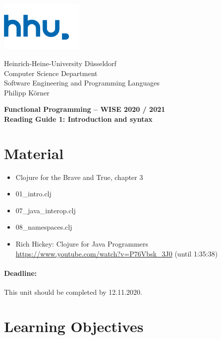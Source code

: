 \documentclass[11pt,a4paper]{article}
\begin{document}
\begin{minipage}[b]{\textwidth}
	\parbox[t]{5cm}{%
		\includegraphics[width=4cm]{unilogo}
		\hfill
	}
	\parbox[b]{11cm}{%
		Heinrich-Heine-University D\"usseldorf\\
		Computer Science Department\\
		Software Engineering and Programming Languages\\
		Philipp K\"orner
	}
\end{minipage}
\begin{center}
	\bf
	Functional Programming -- WISE 2020 / 2021\\
	Reading Guide 1: Introduction and syntax
\end{center}

\pagestyle{empty}

\section{Material} 

\begin{itemize}
\item Clojure for the Brave and True, chapter 3
\item 01\_intro.clj
\item 07\_java\_interop.clj
\item 08\_namespaces.clj
\item Rich Hickey: Clojure for Java Programmers \url{https://www.youtube.com/watch?v=P76Vbsk_3J0} (until 1:35:38)
\end{itemize}

\paragraph{Deadline:} This unit should be completed by 12.11.2020.

\section{Learning Objectives}
\end{document}
